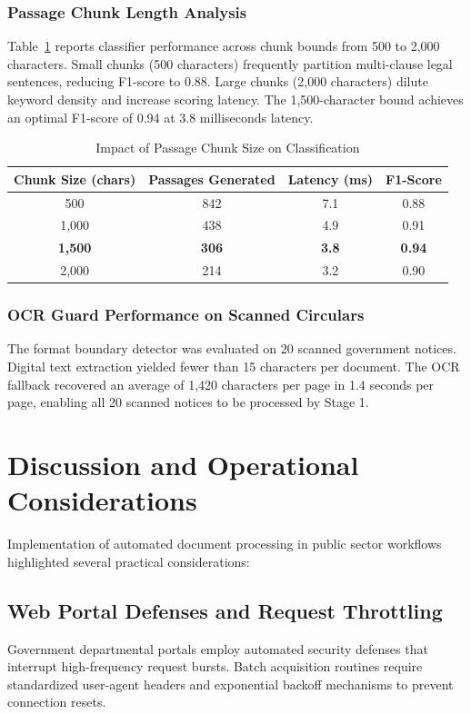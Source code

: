 \documentclass[conference]{IEEEtran}
\begin{document}
\subsubsection{Passage Chunk Length Analysis}
Table~\ref{tab:chunk_ablation} reports classifier performance across chunk bounds from 500 to 2,000 characters. Small chunks (500 characters) frequently partition multi-clause legal sentences, reducing F1-score to 0.88. Large chunks (2,000 characters) dilute keyword density and increase scoring latency. The 1,500-character bound achieves an optimal F1-score of 0.94 at 3.8 milliseconds latency.

\begin{table}[t]
\centering
\caption{Impact of Passage Chunk Size on Classification}
\label{tab:chunk_ablation}
\renewcommand{\arraystretch}{1.2}
\begin{tabularx}{\columnwidth}{cccc}
\toprule
\textbf{Chunk Size (chars)} & \textbf{Passages Generated} & \textbf{Latency (ms)} & \textbf{F1-Score} \\
\midrule
500 & 842 & 7.1 & 0.88 \\
1,000 & 438 & 4.9 & 0.91 \\
\textbf{1,500} & \textbf{306} & \textbf{3.8} & \textbf{0.94} \\
2,000 & 214 & 3.2 & 0.90 \\
\bottomrule
\end{tabularx}
\end{table}

\subsubsection{OCR Guard Performance on Scanned Circulars}
The format boundary detector was evaluated on 20 scanned government notices. Digital text extraction yielded fewer than 15 characters per document. The OCR fallback recovered an average of 1,420 characters per page in 1.4 seconds per page, enabling all 20 scanned notices to be processed by Stage 1.

\section{Discussion and Operational Considerations}

Implementation of automated document processing in public sector workflows highlighted several practical considerations:

\subsection{Web Portal Defenses and Request Throttling}
Government departmental portals employ automated security defenses that interrupt high-frequency request bursts. Batch acquisition routines require standardized user-agent headers and exponential backoff mechanisms to prevent connection resets.
\end{document}
